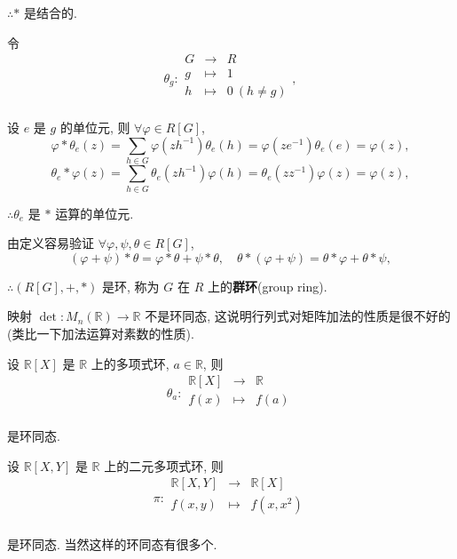\documentclass[color=black,device=normal,lang=cn,mode=geye]{elegantnote}
\begin{document}
\begin{example}
    $\therefore*$ 是结合的.

    令
    \[\theta_g:\begin{array}{rcl}
        G & \to & R \\
        g & \mapsto & 1 \\
        h & \mapsto & 0\ (h\neq g) \\
    \end{array},\]

    设 $e$ 是 $g$ 的单位元, 则 $\forall\varphi\in R[G]$,
    \[\varphi*\theta_e(z)=\sum\limits_{h\in G}\varphi(zh^{-1})\theta_e(h)=\varphi(ze^{-1})\theta_e(e)=\varphi(z),\]
    \[\theta_e*\varphi(z)=\sum\limits_{h\in G}\theta_e(zh^{-1})\varphi(h)=\theta_e(zz^{-1})\varphi(z)=\varphi(z),\]

    $\therefore\theta_e$ 是 $*$ 运算的单位元.

    由定义容易验证 $\forall\varphi,\psi,\theta\in R[G]$,
    \[(\varphi+\psi)*\theta=\varphi*\theta+\psi*\theta,\quad\theta*(\varphi+\psi)=\theta*\varphi+\theta*\psi,\]

    $\therefore(R[G],+,*)$ 是环, 称为 $G$ 在 $R$ 上的\textbf{群环}(group ring).
\end{example}
\begin{example}
    映射 $\det:M_n(\mathbb{R})\to\mathbb{R}$ 不是环同态, 这说明行列式对矩阵加法的性质是很不好的(类比一下加法运算对素数的性质).
\end{example}
\begin{example}
    设 $\mathbb{R}[X]$ 是 $\mathbb{R}$ 上的多项式环, $a\in\mathbb{R}$, 则
    \[\theta_a:\begin{array}{rcl}
        \mathbb{R}[X] & \to & \mathbb{R} \\
        f(x) & \mapsto & f(a) \\
    \end{array}\]

    是环同态.

    设 $\mathbb{R}[X,Y]$ 是 $\mathbb{R}$ 上的二元多项式环, 则
    \[\pi:\begin{array}{rcl}
        \mathbb{R}[X,Y] & \to & \mathbb{R}[X] \\
        f(x,y) & \mapsto & f(x,x^2) \\
    \end{array}\]

    是环同态. 当然这样的环同态有很多个.
\end{example}
\end{document}
